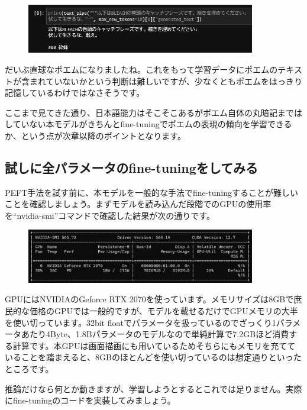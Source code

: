 \documentclass[a5paper,twoside,dvipdfmx]{jsarticle}
\begin{document}
\begin{figure}[h]
  \centering
  \includegraphics[width=100mm]{../C105Fig/gray/generate_2.png}
 \end{figure} 


だいぶ直球なポエムになりましたね。これをもって学習データにポエムのテキストが含まれていないかという判断は難しいですが、少なくともポエムをはっきり記憶しているわけではなさそうです。

ここまで見てきた通り、日本語能力はそこそこあるがポエム自体の丸暗記まではしていない本モデルがきちんとfine-tuningでポエムの表現の傾向を学習できるか、という点が次章以降のポイントとなります。

\subsection{試しに全パラメータのfine-tuningをしてみる}

PEFT手法を試す前に、本モデルを一般的な手法でfine-tuningすることが難しいことを確認しましょう。まずモデルを読み込んだ段階でのGPUの使用率を``nvidia-smi''コマンドで確認した結果が次の通りです。

\begin{figure}[h]
  \centering
  \includegraphics[width=100mm]{../C105Fig/gray/nvidia-smi.png}
 \end{figure} 

GPUにはNVIDIAのGeforce RTX 2070を使っています。メモリサイズは8GBで庶民的な価格のGPUでは一般的ですが、モデルを載せるだけでGPUメモリの大半を使い切っています。32bit floatでパラメータを扱っているのでざっくり1パラメータあたり4Byte、1.8Bパラメータのモデルなので単純計算で7.2GBほど消費する計算です。本GPUは画面描画にも用いているためそちらにもメモリを充てていることを踏まえると、8GBのほとんどを使い切っているのは想定通りといったところです。

推論だけなら何とか動きますが、学習しようとするとこれでは足りません。実際にfine-tuningのコードを実装してみましょう。
\end{document}
